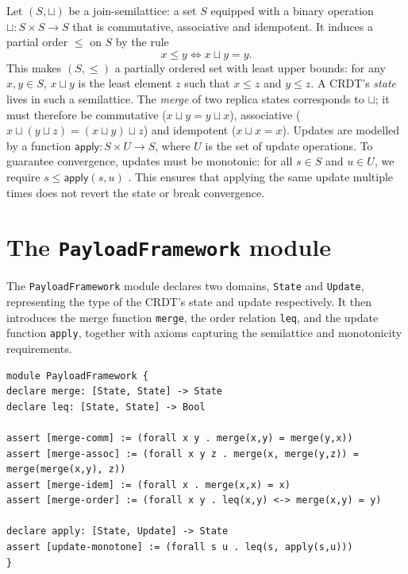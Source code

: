 Let $(S, \sqcup)$ be a join-semilattice: a set $S$ equipped with a binary operation $\sqcup : S \times S \to S$ that is commutative, associative and idempotent.  It induces a partial order $\leq$ on $S$ by the rule
\[
  x \leq y \iff x \sqcup y = y.
\]
This makes $(S,\leq)$ a partially ordered set with least upper bounds: for any $x,y\in S$, $x \sqcup y$ is the least element $z$ such that $x \leq z$ and $y \leq z$.  A CRDT’s \emph{state} lives in such a semilattice.  The \emph{merge} of two replica states corresponds to $\sqcup$; it must therefore be commutative ($x \sqcup y = y \sqcup x$), associative ($x \sqcup (y \sqcup z) = (x \sqcup y) \sqcup z$) and idempotent ($x \sqcup x = x$).  Updates are modelled by a function $\mathsf{apply} : S \times U \to S$, where $U$ is the set of update operations.  To guarantee convergence, updates must be monotonic: for all $s\in S$ and $u\in U$, we require $s \leq \mathsf{apply}(s,u)$ \cite{shapiro2011conflict}.  This ensures that applying the same update multiple times does not revert the state or break convergence.

\section{The \texttt{PayloadFramework} module}\label{sec:payload-code}

The \texttt{PayloadFramework} module declares two domains, \texttt{State} and \texttt{Update}, representing the type of the CRDT’s state and update respectively.  It then introduces the merge function \texttt{merge}, the order relation \texttt{leq}, and the update function \texttt{apply}, together with axioms capturing the semilattice and monotonicity requirements.

\begin{lstlisting}[language=Athena,style=athena]
module PayloadFramework {
declare merge: [State, State] -> State
declare leq: [State, State] -> Bool

assert [merge-comm] := (forall x y . merge(x,y) = merge(y,x))
assert [merge-assoc] := (forall x y z . merge(x, merge(y,z)) = merge(merge(x,y), z))
assert [merge-idem] := (forall x . merge(x,x) = x)
assert [merge-order] := (forall x y . leq(x,y) <-> merge(x,y) = y)

declare apply: [State, Update] -> State
assert [update-monotone] := (forall s u . leq(s, apply(s,u)))
}
\end{lstlisting}

